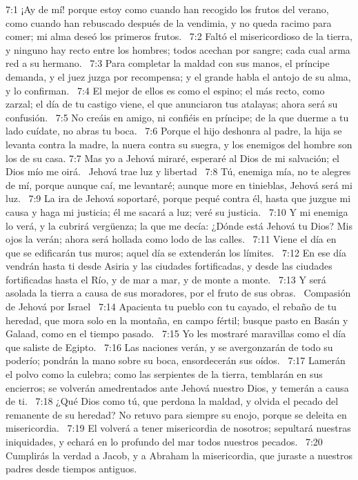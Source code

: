 7:1 ¡Ay de mí! porque estoy como cuando han recogido los frutos del verano, como cuando han rebuscado después de la vendimia, y no queda racimo para comer; mi alma deseó los primeros frutos.  
7:2 Faltó el misericordioso de la tierra, y ninguno hay recto entre los hombres; todos acechan por sangre; cada cual arma red a su hermano.  
7:3 Para completar la maldad con sus manos, el príncipe demanda, y el juez juzga por recompensa; y el grande habla el antojo de su alma, y lo confirman.  
7:4 El mejor de ellos es como el espino; el más recto, como zarzal; el día de tu castigo viene, el que anunciaron tus atalayas; ahora será su confusión.  
7:5 No creáis en amigo, ni confiéis en príncipe; de la que duerme a tu lado cuídate, no abras tu boca.  
7:6 Porque el hijo deshonra al padre, la hija se levanta contra la madre, la nuera contra su suegra, y los enemigos del hombre son los de su casa. 
7:7 Mas yo a Jehová miraré, esperaré al Dios de mi salvación; el Dios mío me oirá.  
Jehová trae luz y libertad  
7:8 Tú, enemiga mía, no te alegres de mí, porque aunque caí, me levantaré; aunque more en tinieblas, Jehová será mi luz.  
7:9 La ira de Jehová soportaré, porque pequé contra él, hasta que juzgue mi causa y haga mi justicia; él me sacará a luz; veré su justicia.  
7:10 Y mi enemiga lo verá, y la cubrirá vergüenza; la que me decía: ¿Dónde está Jehová tu Dios? Mis ojos la verán; ahora será hollada como lodo de las calles.  
7:11 Viene el día en que se edificarán tus muros; aquel día se extenderán los límites.  
7:12 En ese día vendrán hasta ti desde Asiria y las ciudades fortificadas, y desde las ciudades fortificadas hasta el Río, y de mar a mar, y de monte a monte.  
7:13 Y será asolada la tierra a causa de sus moradores, por el fruto de sus obras.  
Compasión de Jehová por Israel  
7:14 Apacienta tu pueblo con tu cayado, el rebaño de tu heredad, que mora solo en la montaña, en campo fértil; busque pasto en Basán y Galaad, como en el tiempo pasado.  
7:15 Yo les mostraré maravillas como el día que saliste de Egipto.  
7:16 Las naciones verán, y se avergonzarán de todo su poderío; pondrán la mano sobre su boca, ensordecerán sus oídos.  
7:17 Lamerán el polvo como la culebra; como las serpientes de la tierra, temblarán en sus encierros; se volverán amedrentados ante Jehová nuestro Dios, y temerán a causa de ti.  
7:18 ¿Qué Dios como tú, que perdona la maldad, y olvida el pecado del remanente de su heredad? No retuvo para siempre su enojo, porque se deleita en misericordia.  
7:19 El volverá a tener misericordia de nosotros; sepultará nuestras iniquidades, y echará en lo profundo del mar todos nuestros pecados.  
7:20 Cumplirás la verdad a Jacob, y a Abraham la misericordia, que juraste a nuestros padres desde tiempos antiguos.